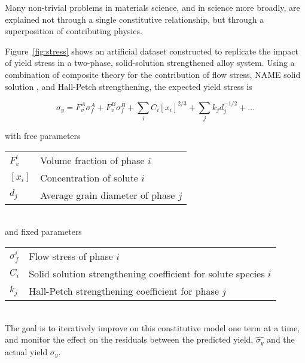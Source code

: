 Many non-trivial problems in materials science, and in science more broadly, are explained not through a single constitutive relationship, but through a superposition of contributing physics.

Figure~\ref{fig:stress} shows an artificial dataset constructed to replicate the impact of yield stress in a two-phase, solid-solution strengthened alloy system. Using a combination of composite theory for the contribution of flow stress, {\color{red} NAME} solid solution \cite{solid solution}, and Hall-Petch \cite{Hall-Petch} strengthening, the expected yield stress is

\begin{equation}
	\sigma_y = F_v^A \sigma_f^A + F_v^B \sigma_f^B + \sum_i C_i [x_i]^{2/3} + \sum_j k_j d_j^{-1/2} + \ldots
\end{equation}

\noindent with free parameters \\[2ex]
\begin{tabular}{l l}
	$F_v^i$	& Volume fraction of phase $i$ \\
	$[x_i]$	& Concentration of solute $i$ \\
	$d_j$	& Average grain diameter of phase $j$
\end{tabular}
\\[2ex]
\noindent and fixed parameters \\[2ex]
\begin{tabular}{l l}
	$\sigma_f^i$	& Flow stress of phase $i$ \\
	$C_i$		& Solid solution strengthening coefficient for solute species $i$ \\
	$k_j$		& Hall-Petch strengthening coefficient for phase $j$
\end{tabular}
\\[2ex]

The goal is to iteratively improve on this constitutive model one term at a time, and monitor the effect on the residuals between the predicted yield, $\hat{\sigma_y}$ and the actual yield $\sigma_y$.

